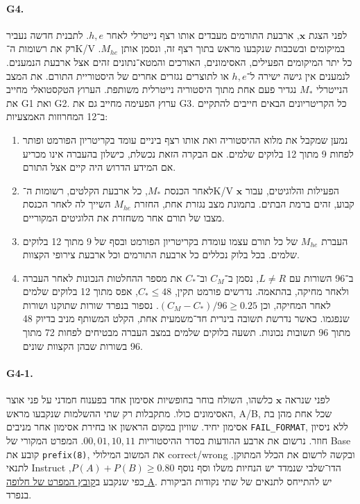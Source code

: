 \documentclass[11pt,a4paper]{article}
\DeclareRobustCommand{\textenglish}[1]{\foreignlanguage{english}{#1}}
\newcommand{\src}[2]{\href{https://github.com/Dnarts/rule110-dependency-fronts/blob/v2.2.1-monograph-multilingual/#1}{#2}}
\theoremstyle{definition}
\begin{document}
\paragraph{\textenglish{G4}.}
לפני הצגת $\mathbf{x}$, ארבעת התורמים מעבדים אותו רצף נייטרלי לאחר $h,e$. לתבנית חדשה נעביר רק את רשומות ה־\textenglish{K/V} במיקומים ובשכבות שנקבעו מראש בתוך רצף זה, ונסמן אותן $M_{he}$. כל יתר המיקומים הפעילים, האסימונים, האורכים והמטא־נתונים זהים אצל ארבעת הנמענים. לנמענים אין גישה ישירה ל־$h,e$ או לתוצרים נגזרים אחרים של היסטוריית התורם. את המצב הנייטרלי $M_*$ נגדיר פעם אחת מתוך היסטוריה נייטרלית משותפת. הערוץ הטקסטואלי מחייב את \textenglish{G1} ואת \textenglish{G2}. ערוץ הפעימה מחייב גם את \textenglish{G3}. כל הקריטריונים הבאים חייבים להתקיים ב־12 המחרוזות האמצעיות:
\begin{enumerate}
\item נמען שמקבל את מלוא ההיסטוריה ואת אותו רצף ביניים עומד בקריטריון הפורמט ופותר לפחות 9 מתוך 12 בלוקים שלמים. אם הבקרה הזאת נכשלת, כישלון בהעברה אינו מכריע אם המידע הדרוש היה קיים אצל התורם.
\item לאחר הכנסת $M_*$, כל ארבעת הקלטים, רשומות ה־\textenglish{K/V} הפעילות והלוגיטים, עבור $\mathbf{x}$ קבוע, זהים ברמת הבתים. בתמונת מצב נגזרת אחת, החזרת $M_{he}$ השייך לה לאחר הכנסת מצבו של תורם אחר משחזרת את הלוגיטים המקוריים.
\item העברת $M_{he}$ של כל תורם עצמו עומדת בקריטריון הפורמט ובסף של 9 מתוך 12 בלוקים שלמים. בכל בלוק נכללים כל ארבעת התורמים וכל ארבעת צירופי הקצוות.
\item ב־96 השורות עם $L\ne R$, נסמן ב־$C_M$ וב־$C_*$ את מספר ההחלטות הנכונות לאחר העברה ולאחר מחיקה, בהתאמה. נדרשים פורמט תקין, $C_*\le48$, אפס מתוך 12 בלוקים שלמים לאחר המחיקה, וכן $(C_M-C_*)/96\ge 0.25$. נספור בנפרד שורות שתוקנו ושורות שנפגמו. כאשר נדרשת תשובה בינרית חד־משמעית אחת, הקלט המשותף מניב בדיוק 48 מתוך 96 תשובות נכונות. תשעה בלוקים שלמים במצב העברה מבטיחים לפחות 72 מתוך 96 בשורות שבהן הקצוות שונים.
\end{enumerate}

\paragraph{\textenglish{G4-1}.}
לפני שנראה $\mathbf{x}$ כלשהו, השולח בוחר בחופשיות אסימון אחד בפענוח חמדני על פני אוצר האסימונים כולו. מתקבלות רק שתי ההשלמות שנקבעו מראש, \textenglish{A/B}, שכל אחת מהן בת אסימון יחיד. שוויון במקום הראשון או בחירת אסימון אחר מניבים \textenglish{\texttt{FAIL\_FORMAT}}, ללא ניסיון חוזר. נרשום את ארבע ההודעות בסדר ההיסטוריות $00,01,10,11$. המפרט המקורי של \textenglish{Base} קובע את \textenglish{\texttt{prefix(8)}}, את המשוב המילולי \textenglish{correct/wrong} ובקשה לרשום את הכלל המתוקן. לתנאי \textenglish{Instruct} הדו־שלבי שנמדד יש הנחיות משלו וסף נוסף $P(A)+P(B)\ge0.80$, כפי שנקבע ב\src{observer/two-step-interface-04.json}{קובץ המפרט של חלופה \textenglish{A}}. יש להתייחס לתנאים של שתי נקודות הביקורת בנפרד.
\end{document}
